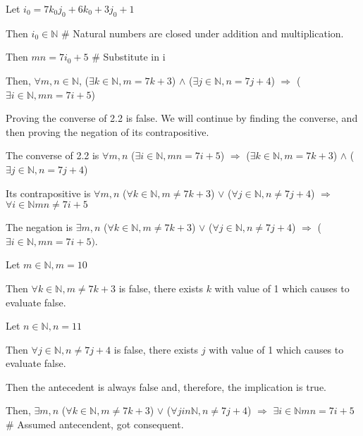 \documentclass{article}
\begin{document}
\begin{enumerate}
\begin{description}
\begin{description}
						\item Let $i_0 = 7k_0j_0 + 6k_0 + 3j_0 + 1$
						\item Then $i_0 \in \mathbb{N}$ \# Natural numbers are closed under addition and multiplication.
						\item Then $mn = 7i_0 + 5$ \# Substitute in i
						\end{description}
				\item Then, $\forall m,n \in \mathbb{N}$, ($\exists k \in \mathbb{N}, m = 7k + 3$) $\wedge$ ($\exists j \in \mathbb{N}, n = 7j + 4$) $\Rightarrow$ ($\exists i \in \mathbb{N}, mn = 7i + 5$)
		\end{description}
\item Proving the converse of 2.2 is false. We will continue by finding the converse, and then proving the negation of its contrapositive.
\begin{description}
		\item The converse of 2.2 is $\forall m,n$ ($\exists i \in \mathbb{N}, mn = 7i + 5$) $\Rightarrow$ ($\exists k \in \mathbb{N}, m = 7k + 3$) $\wedge$ ($\exists j \in \mathbb{N}, n = 7j + 4$)
		\item Its contrapositive is $\forall m,n$ ($\forall k \in \mathbb{N}, m \neq 7k+3$) $\vee$ ($\forall j \in \mathbb{N}, n \neq 7j + 4$) $\Rightarrow$ $\forall i \in \mathbb{N} mn \neq 7i + 5$
		\item The negation is $\exists m,n$ ($\forall k \in \mathbb{N}, m \neq 7k + 3$) $\vee$ ($\forall j \in \mathbb{N}, n \neq 7j + 4$) $\Rightarrow$ ($\exists i \in \mathbb{N}, mn = 7i + 5)$.
		\begin{description}
			\item Let $m \in \mathbb{N}, m = 10$
			\item Then $\forall k \in \mathbb{N}, m \neq 7k + 3$ is false, there exists $k$ with value of 1 which causes to evaluate false.
			\item Let $n \in \mathbb{N}, n = 11$
			\item Then $\forall j \in \mathbb{N}, n \neq 7j + 4$ is false, there exists $j$ with value of 1 which causes to evaluate false. 
			\item Then the antecedent is always false and, therefore, the implication is true.
		\end{description}
		\item Then, $\exists m,n$ ($\forall k \in \mathbb{N}, m \neq 7k + 3$) $\vee$ ($\forall j in \mathbb{N}, n \neq 7j + 4$) $\Rightarrow$ $\exists i \in \mathbb{N} mn = 7i + 5$ \# Assumed antecendent, got consequent.
\end{description}
\end{enumerate}
\end{document}
